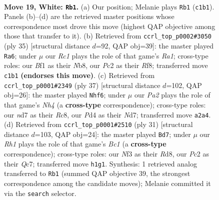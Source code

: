 \documentclass[11pt]{article}
\begin{document}
\clearpage

\begin{figure}[p]\centering
\begin{subfigure}{0.46\textwidth}\centering
\resizebox{\linewidth}{!}{%
\newchessgame
\chessboard[
  setfen={r1bq1rk1/1p1n3p/n1p1p3/p2p1p2/3P1P2/2NQ1N2/PPP2KPP/2R2B1R w - - 0 19},
  showmover=false,
  pgfstyle=straightmove, color=movearrow, markmove={c1-b1}
]}
\caption{}
\end{subfigure}\hfill
\begin{subfigure}{0.46\textwidth}\centering
\resizebox{\linewidth}{!}{%
\newchessgame
\chessboard[
  setfen={rn3rk1/3bqpp1/3p1n2/p6p/Np1NPP1P/1P4P1/P2Q2B1/R4RK1 b - - 1 18},
  showmover=false,
  pgfstyle=straightmove, color=movearrow, markmove={a8-a6}
]}
\caption{}
\end{subfigure}
\\[4pt]
\begin{subfigure}{0.46\textwidth}\centering
\resizebox{\linewidth}{!}{%
\newchessgame
\chessboard[
  setfen={2r1r1k1/pp1n1pp1/2pqb2p/3p3n/3P4/2NBP2P/PPQ2PPN/3RR1K1 b - - 5 19},
  showmover=false,
  pgfstyle=straightmove, color=movearrow, markmove={h5-f6}
]}
\caption{}
\end{subfigure}\hfill
\begin{subfigure}{0.46\textwidth}\centering
\resizebox{\linewidth}{!}{%
\newchessgame
\chessboard[
  setfen={r1br2k1/2q2pp1/ppn1pn1p/3p4/NP6/P1P1PN1P/2Q1BPP1/2R2RK1 b - - 1 16},
  showmover=false,
  pgfstyle=straightmove, color=movearrow, markmove={c8-d7}
]}
\caption{}
\end{subfigure}
\caption{\textbf{Move 19, White: \texttt{Rb1}.} (a) Our position; Melanie plays \texttt{Rb1} (\texttt{c1b1}). Panels (b)--(d) are the retrieved master positions whose correspondence most drove this move (highest QAP objective among those that transfer to it). (b) Retrieved from \texttt{ccrl\_top\_p0002\#3050} (ply 35) [structural distance $d$=92, QAP obj=39]: the master played \texttt{Ra6}; under $\mu$ our \emph{Rc1} plays the role of that game's \emph{Ra1}; cross-type roles: our \emph{B}f1 as their \emph{N}b8, our \emph{P}c2 as their \emph{R}f8; transferred move \texttt{c1b1} \textbf{(endorses this move)}. (c) Retrieved from \texttt{ccrl\_top\_p0001\#2349} (ply 37) [structural distance $d$=102, QAP obj=26]: the master played \texttt{Nhf6}; under $\mu$ our \emph{Pa2} plays the role of that game's \emph{Nh4} (a \textbf{cross-type} correspondence); cross-type roles: our \emph{n}d7 as their \emph{R}c8, our \emph{P}d4 as their \emph{N}d7; transferred move \texttt{a2a4}. (d) Retrieved from \texttt{ccrl\_top\_p0001\#2510} (ply 31) [structural distance $d$=103, QAP obj=24]: the master played \texttt{Bd7}; under $\mu$ our \emph{Rh1} plays the role of that game's \emph{Bc1} (a \textbf{cross-type} correspondence); cross-type roles: our \emph{N}f3 as their \emph{R}d8, our \emph{P}c2 as their \emph{Q}c7; transferred move \texttt{h1g1}. Synthesis: 1 retrieved analog transferred to \texttt{Rb1} (summed QAP objective 39, the strongest correspondence among the candidate moves); Melanie committed it via the \texttt{search} selector.}
\label{fig:thought-m36}
\end{figure}
\end{document}
